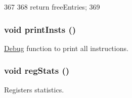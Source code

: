 \begin{DoxyCode}
367 {
368     return freeEntries;
369 }
\end{DoxyCode}
\hypertarget{classInstQueue_afc9c0c90c27fe0dc8bd4da915596bc21}{
\subsubsection[{printInsts}]{\setlength{\rightskip}{0pt plus 5cm}void printInsts ()}}
\label{classInstQueue_afc9c0c90c27fe0dc8bd4da915596bc21}
\hyperlink{namespaceDebug}{Debug} function to print all instructions. \hypertarget{classInstQueue_a4dc637449366fcdfc4e764cdf12d9b11}{
\subsubsection[{regStats}]{\setlength{\rightskip}{0pt plus 5cm}void regStats ()}}
\label{classInstQueue_a4dc637449366fcdfc4e764cdf12d9b11}
Registers statistics. 


